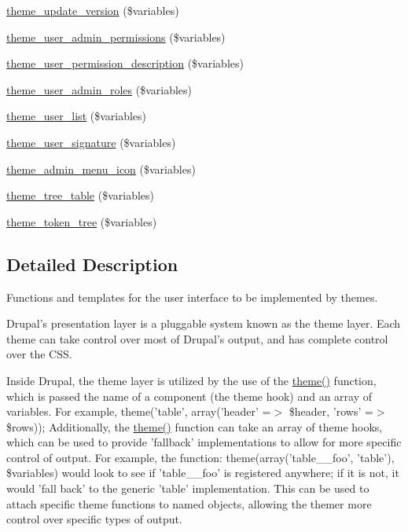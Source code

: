 \begin{DoxyCompactItemize}
\hyperlink{group__themeable_ga04407a35c1e7805fa3db729df5857903}{theme\_\-update\_\-version} (\$variables)
\item 
\hyperlink{group__themeable_gad8be4d71043b96d113f321c62f457765}{theme\_\-user\_\-admin\_\-permissions} (\$variables)
\item 
\hyperlink{group__themeable_ga459815f84e50a6416f625577c99b9017}{theme\_\-user\_\-permission\_\-description} (\$variables)
\item 
\hyperlink{group__themeable_gad4ed00385370ab78b0edbc7ec01b729f}{theme\_\-user\_\-admin\_\-roles} (\$variables)
\item 
\hyperlink{group__themeable_ga0c401997f59cbc4603fbd353e27eac2d}{theme\_\-user\_\-list} (\$variables)
\item 
\hyperlink{group__themeable_gabbd05d2d793e3f9ab99fee965bc3bbc2}{theme\_\-user\_\-signature} (\$variables)
\item 
\hyperlink{group__themeable_gab93751624cbfa203208fba5c90192ee1}{theme\_\-admin\_\-menu\_\-icon} (\$variables)
\item 
\hyperlink{group__themeable_ga27af1c0cde4fa8fd2b1ac04f516e2ca6}{theme\_\-tree\_\-table} (\$variables)
\item 
\hyperlink{group__themeable_ga134bf969c587784a30834201a24284e2}{theme\_\-token\_\-tree} (\$variables)
\end{DoxyCompactItemize}


\subsection{Detailed Description}
Functions and templates for the user interface to be implemented by themes.

Drupal's presentation layer is a pluggable system known as the theme layer. Each theme can take control over most of Drupal's output, and has complete control over the CSS.

Inside Drupal, the theme layer is utilized by the use of the \hyperlink{includes_2theme_8inc_a7c25609a935874541a19657affd30fff}{theme()} function, which is passed the name of a component (the theme hook) and an array of variables. For example, theme('table', array('header' =$>$ \$header, 'rows' =$>$ \$rows)); Additionally, the \hyperlink{includes_2theme_8inc_a7c25609a935874541a19657affd30fff}{theme()} function can take an array of theme hooks, which can be used to provide 'fallback' implementations to allow for more specific control of output. For example, the function: theme(array('table\_\-\_\-foo', 'table'), \$variables) would look to see if 'table\_\-\_\-foo' is registered anywhere; if it is not, it would 'fall back' to the generic 'table' implementation. This can be used to attach specific theme functions to named objects, allowing the themer more control over specific types of output.

